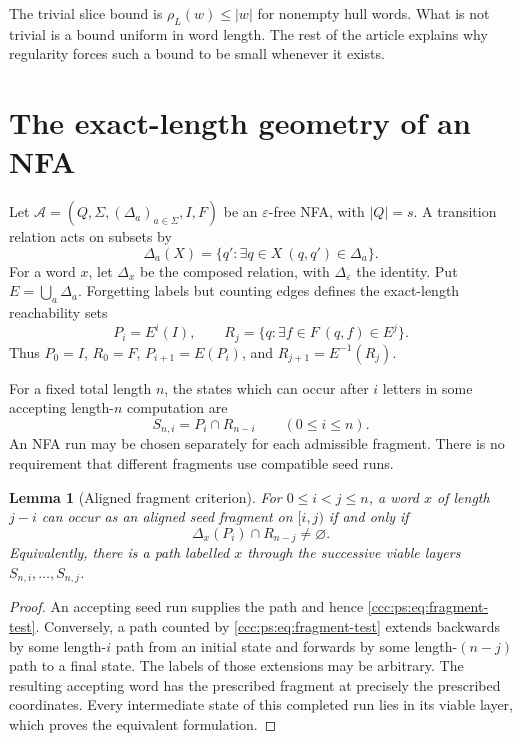 \documentclass[11pt,letterpaper]{article}
\newtheorem{lemma}[theorem]{Lemma}
\theoremstyle{definition}
\theoremstyle{remark}
\newcommand{\eps}{\varepsilon}
\newcommand{\rank}{\rho}
\begin{document}
The trivial slice bound is $\rank_L(w)\le|w|$ for nonempty hull words. What
is not trivial is a bound uniform in word length. The rest of the article
explains why regularity forces such a bound to be small whenever it exists.

\section{The exact-length geometry of an NFA}\label{ccc:ps:sec:layers}

Let $\mathcal A=(Q,\Sigma,(\Delta_a)_{a\in\Sigma},I,F)$ be an
$\eps$-free NFA, with $|Q|=s$. A transition relation acts on subsets by
\[
 \Delta_a(X)=\{q':\exists q\in X\ (q,q')\in\Delta_a\}.
\]
For a word $x$, let $\Delta_x$ be the composed relation, with
$\Delta_\eps$ the identity. Put $E=\bigcup_a\Delta_a$. Forgetting labels
but counting edges defines the exact-length reachability sets
\begin{equation}\label{ccc:ps:eq:PR}
 P_i=E^i(I),\qquad
 R_j=\{q:\exists f\in F\ (q,f)\in E^j\}.
\end{equation}
Thus $P_0=I$, $R_0=F$, $P_{i+1}=E(P_i)$, and
$R_{j+1}=E^{-1}(R_j)$.

For a fixed total length $n$, the states which can occur after $i$ letters
in some accepting length-$n$ computation are
\begin{equation}\label{ccc:ps:eq:viable-layer}
 S_{n,i}=P_i\cap R_{n-i}\qquad(0\le i\le n).
\end{equation}
An NFA run may be chosen separately for each admissible fragment. There
is no requirement that different fragments use compatible seed runs.

\begin{lemma}[Aligned fragment criterion]\label{ccc:ps:lem:fragment}
For $0\le i<j\le n$, a word $x$ of length $j-i$ can occur as an aligned
seed fragment on $[i,j)$ if and only if
\begin{equation}\label{ccc:ps:eq:fragment-test}
 \Delta_x(P_i)\cap R_{n-j}\ne\varnothing.
\end{equation}
Equivalently, there is a path labelled $x$ through the successive viable
layers $S_{n,i},\ldots,S_{n,j}$.
\end{lemma}
\begin{proof}
An accepting seed run supplies the path and hence
\eqref{ccc:ps:eq:fragment-test}. Conversely, a path counted by
\eqref{ccc:ps:eq:fragment-test} extends backwards by some length-$i$ path from an
initial state and forwards by some length-$(n-j)$ path to a final state.
The labels of those extensions may be arbitrary. The resulting accepting
word has the prescribed fragment at precisely the prescribed coordinates.
Every intermediate state of this completed run lies in its viable layer,
which proves the equivalent formulation.
\end{proof}
\end{document}
